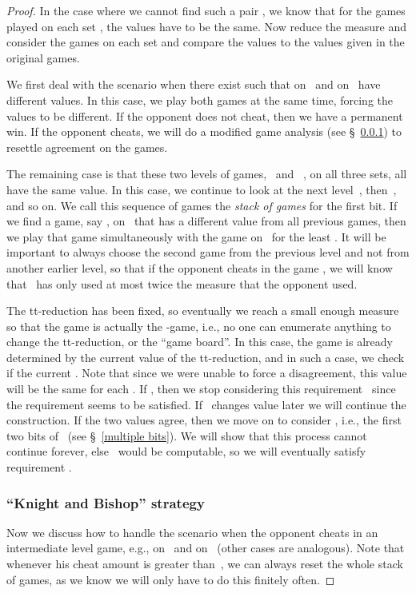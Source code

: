 \documentclass{LMCS}
\newcommand{\0}{\mathbf{0}}
\newcommand{\<}{\langle}
\renewcommand{\>}{\rangle}
\begin{document}
\begin{proof}
In the case where we cannot find such a pair , we know that for the
games  played on each set , the values
have to be the same. Now reduce the measure and consider the games
 on each set and compare the values to the
values given in the original games.

We first deal with the scenario when there exist  such that
 on~ and 
on~ have different values. In this case, we play both games at the same
time, forcing the values to be different. If the opponent does not cheat,
then we have a permanent win. If the opponent cheats, we will do a modified
game analysis (see \S~\ref{bishop}) to resettle agreement on the games.

The remaining case is that these two levels of games,~ and
~, on all three sets, all have the same value. In this case, we
continue to look at the next level~, then~, and
so on.  We call this sequence of games the \emph{stack of games} for the
first bit.  If we find a game, say
, on~ that has a different
value from all previous games, then we play that game simultaneously with the
game  on~ for the least .
It will be important to always choose the second game from the previous level
and not from another earlier level, so that if the opponent cheats in the
game , we will know that~
has only used at most twice the measure that the opponent used.

The tt-reduction has been fixed, so eventually we reach a small enough
measure so that the game is actually the -game, i.e., no one can enumerate
anything to change the tt-reduction, or the ``game board''. In this case, the
game is already determined by the current value of the tt-reduction, and in
such a case, we check if the current .  Note that
since we were unable to force a disagreement, this value will be the same for
each .  If , then we stop considering
this requirement~ since the requirement seems to be satisfied.
If~ changes value later we will continue the construction. If the two
values agree, then we move on to consider , i.e., the first two
bits of~ (see \S~\ref{multiple bits}).  We will show that this
process cannot continue forever, else~ would be computable, so we will
eventually satisfy requirement .


\subsubsection{``Knight and Bishop'' strategy}\label{bishop}

Now we discuss how to handle the scenario when the opponent cheats in an
intermediate level game, e.g.,  on~ and
 on~ (other cases are analogous). Note that
whenever his cheat amount is greater than~, we can always reset
the whole stack of games, as we know we will only have to do this finitely
often.


\end{proof}
\end{document}
